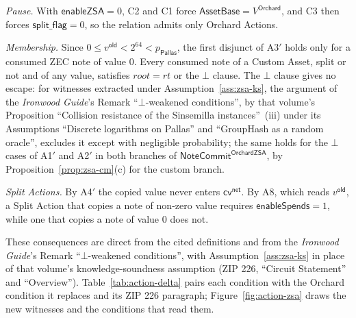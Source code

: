 \documentclass[11pt,a4paper]{article}
\theoremstyle{definition}
\newcommand{\cvsym}{\mathsf{cv}}
\newcommand{\Pallas}{\ensuremath{\mathsf{Pallas}}}
\newcommand{\NoteCommit}{\ensuremath{\mathsf{NoteCommit}}}
\begin{document}
\emph{Pause.} With $\mathsf{enableZSA} = 0$, C2 and C1 force
$\mathsf{AssetBase} = V^{\mathsf{Orchard}}$, and C3 then forces
$\mathsf{split\_flag} = 0$, so the relation admits only Orchard Actions.

\emph{Membership.} Since $0 \le v^{\mathsf{old}} < 2^{64} < p_{\Pallas}$,
the first disjunct of A3$'$ holds only for a consumed ZEC note of value
$0$. Every consumed note of a Custom Asset, split or not and of any value,
satisfies $\mathit{root} = \mathit{rt}$ or the $\bot$ clause. The $\bot$
clause gives no escape: for witnesses extracted under
Assumption~\ref{ass:zsa-ks}, the argument of the \emph{Ironwood Guide}'s
Remark ``$\bot$-weakened conditions'', by that volume's Proposition
``Collision resistance of the Sinsemilla instances''~(iii) under its
Assumptions ``Discrete logarithms on Pallas'' and ``GroupHash as a random
oracle'', excludes it except with negligible probability; the same holds
for the $\bot$ cases of A1$'$ and A2$'$ in both branches of
$\NoteCommit^{\mathsf{OrchardZSA}}$, by
Proposition~\ref{prop:zsa-cm}(c) for the custom branch.

\emph{Split Actions.} By A4$'$ the copied value never enters
$\cvsym^{\mathsf{net}}$. By A8, which reads $v^{\mathsf{old}}$, a Split
Action that copies a note of non-zero value requires
$\mathsf{enableSpends} = 1$, while one that copies a note of value $0$
does not.

These consequences are direct from the cited definitions and from the
\emph{Ironwood Guide}'s Remark ``$\bot$-weakened conditions'', with
Assumption~\ref{ass:zsa-ks} in place of that volume's knowledge-soundness
assumption (ZIP 226, ``Circuit Statement'' and ``Overview'').
Table~\ref{tab:action-delta} pairs each condition with the Orchard
condition it replaces and its ZIP 226 paragraph;
Figure~\ref{fig:action-zsa} draws the new witnesses and the conditions that
read them.
\end{document}
